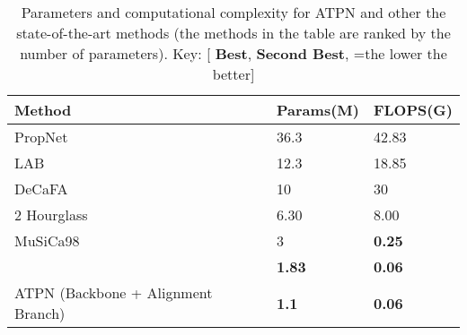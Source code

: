\documentclass[3p,twocolumn, round, sort & compress]{elsarticle}
\begin{document}
\begin{table}[t!]
	\centering
	\begin{tabular}{m{3cm}<{\centering}m{1.6cm}<{\centering}m{1.6cm}<{\centering}}
		\hline
		Method  & Params(M) & FLOPS(G) \\ \hline
		PropNet \citep{PropNet} & 36.3  & 42.83 \\ 
		LAB\citep{LAB} & 12.3 & 18.85 \\
		DeCaFA \citep{DeCaFA} & 10 & 30  \\
		2 Hourglass \citep{Hourglass} & 6.30 & 8.00 \\
		MuSiCa98 \citep{KWTQ} & 3 & {\color{blue} \textbf{0.25}}\\
		 \citep{RFA} & {\color{blue} \textbf{1.83}} & {\color{red} \textbf{0.06}} \\
		ATPN (Backbone + Alignment Branch) & {\color{red} \textbf{1.1}} & {\color{red} \textbf{0.06}} \\ \hline
	\end{tabular}
	\caption{Parameters and computational complexity for ATPN and other the state-of-the-art methods (the methods in the table are ranked by the number of parameters). Key: [{\color{red} \textbf{Best}}, {\color{blue} \textbf{Second Best}}, =the lower the better]}
	\label{Tabal2}
\end{table}
\end{document}
